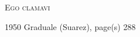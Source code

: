\documentclass[10pt, letterpaper]{article}
\begin{document}
\newcommand{\red}[1]{\textcolor{red}{#1}}

\begin{center}\begin{huge}\textsc{Ego clamavi}\end{huge}\end{center}
\begin{center}1950 Graduale (Suarez), page(s) 288\end{center}


\def\greinitialformat#1{%
{\fontsize{31}{31}\selectfont #1}%
}

\gresetfirstlineaboveinitial{\small \textbf{}}{\small \textbf{}}
\commentary{{\small \emph{}}}

\grespaceabovelines=3mm

\end{document}
